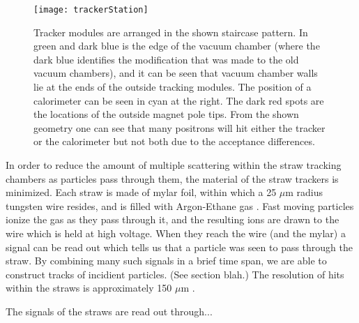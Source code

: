 \begin{figure}[]
    \centering
    \texttt{[image: trackerStation]}
    \caption[Tracker module arrangement]{Tracker modules are arranged in the shown staircase pattern. In green and dark blue is the edge of the vacuum chamber (where the dark blue identifies the modification that was made to the old vacuum chambers), and it can be seen that vacuum chamber walls lie at the ends of the outside tracking modules. The position of a calorimeter can be seen in cyan at the right. The dark red spots are the locations of the outside magnet pole tips. From the shown geometry one can see that many positrons will hit either the tracker or the calorimeter but not both due to the acceptance differences.}
    \label{fig:staircase}
\end{figure}

In order to reduce the amount of multiple scattering within the straw tracking chambers as particles pass through them, the material of the straw trackers is minimized. Each straw is made of mylar foil, within which a 25 $\mu$m radius tungsten wire resides, and is filled with Argon-Ethane gas \cite{something}. Fast moving particles ionize the gas as they pass through it, and the resulting ions are drawn to the wire which is held at high voltage. When they reach the wire (and the mylar) a signal can be read out which tells us that a particle was seen to pass through the straw. By combining many such signals in a brief time span, we are able to construct tracks of incidient particles. (See section blah.) The resolution of hits within the straws is approximately 150 $\mu$m \cite{something}.

The signals of the straws are read out through...


